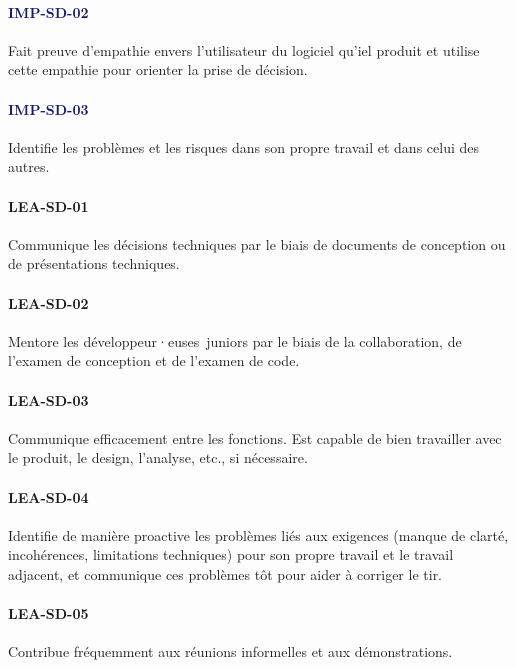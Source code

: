 \documentclass[a4paper, french, openany, 12pt]{book}
\newcommand\wis[1]{\textcolor{MidnightBlue}{\textbf{\uppercase{imp-{#1}}}}}
\newcommand\cha[1]{\textcolor{OliveGreen}{\textbf{\uppercase{lea-{#1}}}}}
\newcommand\devs{développeur·euses}
\begin{document}
\begin{multicols}{2}
  \paragraph*{\wis{sd-02}}

  Fait preuve d'empathie envers l'utilisateur du logiciel qu'iel produit et utilise cette empathie pour orienter la
  prise de décision.

  \paragraph*{\wis{sd-03}}

  Identifie les problèmes et les risques dans son propre travail et dans celui des autres.

  \paragraph*{\cha{sd-01}}

  Communique les décisions techniques par le biais de documents de conception ou de présentations techniques.

  \paragraph*{\cha{sd-02}}

  Mentore les \devs\ juniors par le biais de la collaboration, de l'examen de conception et de l'examen de code.

  \paragraph*{\cha{sd-03}}

  Communique efficacement entre les fonctions.
  Est capable de bien travailler avec le produit, le design, l'analyse, etc., si nécessaire.

  \paragraph*{\cha{sd-04}}

  Identifie de manière proactive les problèmes liés aux exigences (manque de clarté, incohérences, limitations
  techniques) pour son propre travail et le travail adjacent, et communique ces problèmes tôt pour aider à corriger le
  tir.

  \paragraph*{\cha{sd-05}}

  Contribue fréquemment aux réunions informelles et aux démonstrations.

\end{multicols}
\end{document}
